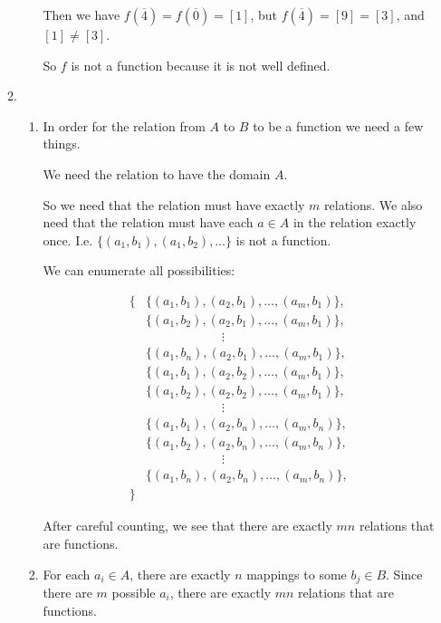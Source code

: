 \documentclass[12pt,letterpaper]{article}
\begin{document}
\begin{enumerate}
\begin{enumerate}
\begin{enumerate}
              Then we have $f\left(\overline{4}\right) = f\left(\overline{0}\right) = [1]$,
              but $f\left(\overline{4}\right) = [9] = [3]$, and $[1] \neq [3]$.

              So $f$ is not a function because it is not well defined.
          \end{enumerate}
        \setcounter{enumii}{16}
        \item
          \begin{enumerate}
            \item
              In order for the relation from $A$ to $B$ to be a function we need a few things.

              We need the relation to have the domain $A$.

              So we need that the relation must have exactly $m$ relations.
              We also need that the relation must have each $a \in A$ in the relation exactly once.
              I.e. $\{(a_1, b_1), (a_1, b_2), \dots\}$ is not a function.

              We can enumerate all possibilities:

              \begin{align*}
                \{
                  &\{ (a_1, b_1), (a_2, b_1), \dots, (a_m, b_1) \}, \\
                  &\{ (a_1, b_2), (a_2, b_1), \dots, (a_m, b_1) \}, \\
                  & \quad \quad \quad \quad \quad \quad \vdots \\
                  &\{ (a_1, b_n), (a_2, b_1), \dots, (a_m, b_1) \}, \\
                  &\{ (a_1, b_1), (a_2, b_2), \dots, (a_m, b_1) \}, \\
                  &\{ (a_1, b_2), (a_2, b_2), \dots, (a_m, b_1) \}, \\
                  & \quad \quad \quad \quad \quad \quad \vdots \\
                  &\{ (a_1, b_1), (a_2, b_n), \dots, (a_m, b_n) \}, \\
                  &\{ (a_1, b_2), (a_2, b_n), \dots, (a_m, b_n) \}, \\
                  & \quad \quad \quad \quad \quad \quad \vdots \\
                  &\{ (a_1, b_n), (a_2, b_n), \dots, (a_m, b_n) \}, \\
                \}
              \end{align*}

              After careful counting, we see that there are exactly $mn$ relations that are functions.
            \item
              For each $a_i \in A$, there are exactly $n$ mappings to some $b_j \in B$. Since there are $m$ possible $a_i$, there are exactly $mn$ relations that are functions.
          \end{enumerate}
      \end{enumerate}
  \end{enumerate}
\end{document}
